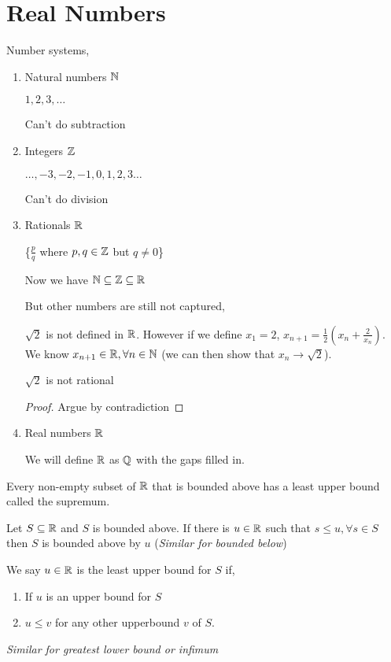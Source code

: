 \pagebreak
\section{Real Numbers}
Number systems,
\begin{enumerate}
    \item Natural numbers $\mathbb{N}$

        $1,2,3, \dots$

        Can't do subtraction
    \item Integers  $\mathbb{Z}$

         $\dots, -3, -2, -1, 0, 1, 2, 3 \dots$ 


         Can't do division

     \item Rationals $\mathbb{R}$

         \{$\frac{p}{q}$ where $p,q \in \mathbb{Z}$ but  $q \ne 0$\}

    Now we have $\mathbb{N} \subseteq \mathbb{Z} \subseteq \mathbb{R}$

    But other numbers are still not captured, 


\begin{eg}
    $\sqrt{2}$ is not defined in  $\mathbb{R}$.
    However if we  define $x_1 = 2$, $x_{n + 1} = \frac{1}{2}(x_n + \frac{2}{x_n})$. We know $x_{n + 1} \in \mathbb{R}, \forall n \in \mathbb{N}$ (we can then show that $x_n \to \sqrt{2}$).
\end{eg}


\begin{theorem}
    $\sqrt{2}$ is not rational
\end{theorem}
\begin{proof}
    Argue by contradiction
\end{proof}

\item Real numbers $\mathbb{R}$

We will define $\mathbb{R}$ as $\mathbb{Q}$ with the gaps filled in.
\end{enumerate}


\begin{definition}
    Every non-empty subset of $\mathbb{R}$ that is bounded above has a least upper bound called the supremum.
\end{definition}
Let $S \subseteq \mathbb{R}$ and  $S$ is bounded above. If there is  $u \in \mathbb{R}$ such that $s \le u, \forall s \in S$ then  $S$ is bounded above by $u$ (\textit{Similar for bounded below})

\begin{definition}
    We say $u \in \mathbb{R}$ is the least upper bound for  $S$ if, 
    
    \begin{enumerate}
        \item If $u$ is an upper bound for  $S$
        \item  $u \le v$ for any other upperbound  $v$ of  $S$.
    \end{enumerate}
\end{definition}
\textit{Similar for greatest lower bound or infimum}
